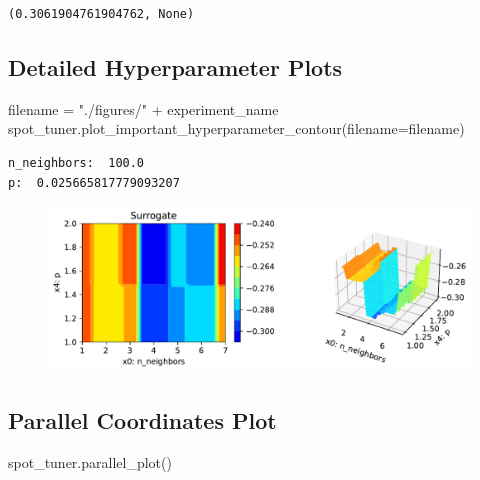 \documentclass[
  letterpaper,
  DIV=11,
  numbers=noendperiod]{scrreprt}
\newenvironment{Shaded}{\begin{snugshade}}{\end{snugshade}}
\newcommand{\NormalTok}[1]{\textcolor[rgb]{0.00,0.23,0.31}{#1}}
\newcommand{\OperatorTok}[1]{\textcolor[rgb]{0.37,0.37,0.37}{#1}}
\newcommand{\StringTok}[1]{\textcolor[rgb]{0.13,0.47,0.30}{#1}}
\begin{document}
\begin{verbatim}
(0.3061904761904762, None)
\end{verbatim}

\hypertarget{detailed-hyperparameter-plots-6}{%
\subsection{Detailed Hyperparameter
Plots}\label{detailed-hyperparameter-plots-6}}

\begin{Shaded}
\begin{Highlighting}[]
\NormalTok{filename }\OperatorTok{=} \StringTok{"./figures/"} \OperatorTok{+}\NormalTok{ experiment\_name}
\NormalTok{spot\_tuner.plot\_important\_hyperparameter\_contour(filename}\OperatorTok{=}\NormalTok{filename)}
\end{Highlighting}
\end{Shaded}

\begin{verbatim}
n_neighbors:  100.0
p:  0.025665817779093207
\end{verbatim}

\begin{figure}[H]

{\centering \includegraphics{19_spot_hpt_sklearn_multiclass_classification_knn_files/figure-pdf/cell-47-output-2.pdf}

}

\end{figure}

\hypertarget{parallel-coordinates-plot-4}{%
\subsection{Parallel Coordinates
Plot}\label{parallel-coordinates-plot-4}}

\begin{Shaded}
\begin{Highlighting}[]
\NormalTok{spot\_tuner.parallel\_plot()}
\end{Highlighting}
\end{Shaded}
\end{document}
